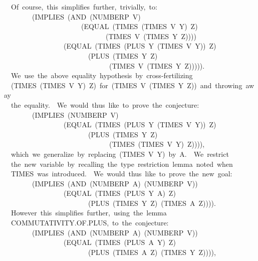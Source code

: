 \documentclass[10pt]{book}
\newenvironment{pubasis}{\begin{flushleft}}{\end{flushleft}}
\begin{document}
\begin{pubasis}
~~Of~course,~this~simplifies~further,~trivially,~to:\\

~~~~~~~~(IMPLIES~(AND~(NUMBERP~V)\\
~~~~~~~~~~~~~~~~~~~~~~(EQUAL~(TIMES~(TIMES~V~Y)~Z)\\
~~~~~~~~~~~~~~~~~~~~~~~~~~~~~(TIMES~V~(TIMES~Y~Z))))\\
~~~~~~~~~~~~~~~~~(EQUAL~(TIMES~(PLUS~Y~(TIMES~V~Y))~Z)\\
~~~~~~~~~~~~~~~~~~~~~~~~(PLUS~(TIMES~Y~Z)\\
~~~~~~~~~~~~~~~~~~~~~~~~~~~~~~(TIMES~V~(TIMES~Y~Z))))).\\

~~We~use~the~above~equality~hypothesis~by~cross-fertilizing\\
~~(TIMES~(TIMES~V~Y)~Z)~for~(TIMES~V~(TIMES~Y~Z))~and~throwing~away\\
~~the~equality.~~We~would~thus~like~to~prove~the~conjecture:\\

~~~~~~~~(IMPLIES~(NUMBERP~V)\\
~~~~~~~~~~~~~~~~~(EQUAL~(TIMES~(PLUS~Y~(TIMES~V~Y))~Z)\\
~~~~~~~~~~~~~~~~~~~~~~~~(PLUS~(TIMES~Y~Z)\\
~~~~~~~~~~~~~~~~~~~~~~~~~~~~~~(TIMES~(TIMES~V~Y)~Z)))),\\

~~which~we~generalize~by~replacing~(TIMES~V~Y)~by~A.~~We~restrict\\
~~the~new~variable~by~recalling~the~type~restriction~lemma~noted~when\\
~~TIMES~was~introduced.~~We~would~thus~like~to~prove~the~new~goal:\\

~~~~~~~~(IMPLIES~(AND~(NUMBERP~A)~(NUMBERP~V))\\
~~~~~~~~~~~~~~~~~(EQUAL~(TIMES~(PLUS~Y~A)~Z)\\
~~~~~~~~~~~~~~~~~~~~~~~~(PLUS~(TIMES~Y~Z)~(TIMES~A~Z)))).\\

~~However~this~simplifies~further,~using~the~lemma\\
~~COMMUTATIVITY.OF.PLUS,~to~the~conjecture:\\

~~~~~~~~(IMPLIES~(AND~(NUMBERP~A)~(NUMBERP~V))\\
~~~~~~~~~~~~~~~~~(EQUAL~(TIMES~(PLUS~A~Y)~Z)\\
~~~~~~~~~~~~~~~~~~~~~~~~(PLUS~(TIMES~A~Z)~(TIMES~Y~Z)))),\\


\end{pubasis}
\end{document}
